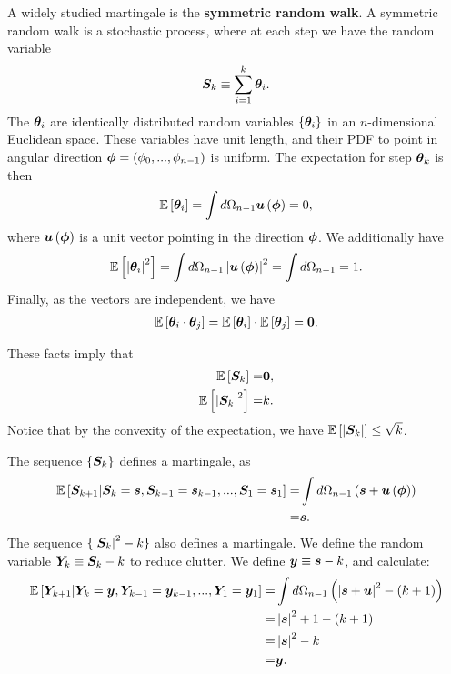 A widely studied martingale is the \textbf{symmetric random walk}.
A symmetric random walk is a stochastic process, where at each step we have the random variable
\begin{align}
    \label{eq:def-random-walk-vector-sum}
    {\bm S}_k
    \equiv
    \sum_{i=1}^k{\bm \theta}_i
    .
\end{align}
The ${\bm \theta}_i$ are identically distributed random variables $\{{\bm \theta}_i\}$ in an $n$-dimensional Euclidean space.
These variables have unit length, and their PDF to point in angular direction ${\bm \phi}=\left(\phi_0,...,\phi_{n-1}\right)$ is uniform.
The expectation for step ${\bm \theta}_k$ is then
\begin{align}
    \mathbb{E}\left[{\bm \theta}_{i}\right]
    =
    \int d\Omega_{n-1} {\bm u}\left({\bm \phi}\right)
    =
    0
    ,
\end{align}
where ${\bm u}\left({\bm \phi}\right)$ is a unit vector pointing in the direction ${\bm \phi}$.
We additionally have
\begin{align}
    \mathbb{E}\left[\left|{\bm \theta}_i\right|^2\right]
    =
    \int d\Omega_{n-1} \left|{\bm u}\left({\bm \phi}\right)\right|^2
    =
    \int d\Omega_{n-1} 
    =
    1
    .
\end{align}
Finally, as the vectors are independent, we have
\begin{align}
    \mathbb{E}\left[{\bm \theta}_i\cdot{\bm \theta}_j\right]
    =
    \mathbb{E}\left[{\bm \theta}_i\right]
    \cdot
    \mathbb{E}\left[{\bm \theta}_j\right]
    =
    {\bm 0}
    .
\end{align}

These facts imply that
\begin{align}
    \mathbb{E}\left[{\bm S}_k\right]
    =&
    {\bm 0}
    ,\\
    \mathbb{E}\left[\left|{\bm S}_k\right|^2\right]
    =&
    k
    .
\end{align}
Notice that by the convexity of the expectation, we have $\mathbb{E}\left[\left|{\bm S}_k\right|\right]\leq \sqrt{k}$.

The sequence $\{{\bm S}_k\}$ defines a martingale, as
\begin{align}
    \mathbb{E}\left[{\bm S}_{k+1}|{\bm S}_{k}={\bm s},{\bm S}_{k-1}={\bm s}_{k-1},...,{\bm S}_1={\bm s}_1\right]
    =&
    \int d\Omega_{n-1} \left({\bm s} + {\bm u}\left({\bm \phi}\right)\right)
    \nonumber\\
    =&
    {\bm s}
    .
\end{align}
The sequence $\{\left|{\bm S}_{k}\right|^2 - k\}$ also defines a martingale.
We define the random variable ${\bm Y}_k \equiv {\bm S}_k - k$ to reduce clutter.
We define ${\bm y} \equiv {\bm s} - k$, and calculate:
\begin{align}
    \mathbb{E}\left[{\bm Y}_{k+1}|{\bm Y}_{k}={\bm y},{\bm Y}_{k-1}={\bm y}_{k-1},...,{\bm Y}_1={\bm y}_1\right]
    =&
    \int d\Omega_{n-1} \left(
        \left|{\bm s} + {\bm u}\right|^2
        -
        \left(k+1\right)
    \right)
    \nonumber\\
    =&
    \left|{\bm s}\right|^2
    +
    1
    -
    \left(k+1\right)
    \nonumber\\
    =&
    \left|{\bm s}\right|^2
    -
    k
    \nonumber\\
    =&
    {\bm y}
    .
\end{align}

